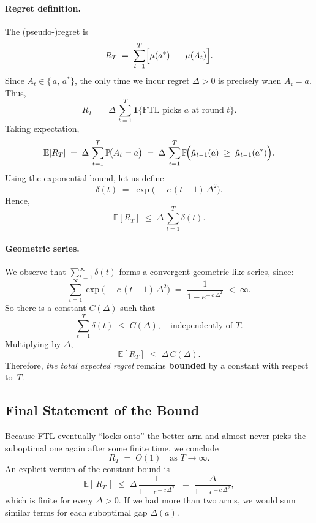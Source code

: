 \paragraph{Regret definition.}
The (pseudo-)regret is
\[
  R_T
  \;=\;
  \sum_{t=1}^T
  \Bigl[\mu(a^*) \;-\;\mu(A_t)\Bigr].
\]
Since $A_t \in \{\,a,\,a^*\!\}$, the only time we incur regret $\Delta>0$ is precisely when $A_t=a$.  Thus,
\[
  R_T
  \;=\;
  \Delta \,\sum_{t=1}^T \mathbf{1}\{\text{FTL picks $a$ at round $t$}\}.
\]
Taking expectation,
\[
  \mathbb{E}[R_T]
  \;=\;
  \Delta \,\sum_{t=1}^T
  \mathbb{P}\!\bigl(A_t = a\bigr)
  \;=\;
  \Delta \,\sum_{t=1}^T
  \mathbb{P}\!\Bigl(\hat{\mu}_{t-1}(a)\;\ge\;\hat{\mu}_{t-1}(a^*)\Bigr).
\]
Using the exponential bound, let us define
\[
  \delta(t)
  \;=\;
  \exp\bigl(-\,c\,(t-1)\,\Delta^2\bigr).
\]
Hence,
\[
  \mathbb{E}[R_T]
  \;\le\;
  \Delta \,\sum_{t=1}^T \delta(t).
\]

\paragraph{Geometric series.}
We observe that $\sum_{t=1}^\infty \delta(t)$ forms a convergent geometric-like series, since:
\[
  \sum_{t=1}^\infty
  \exp\bigl(-\,c\,(t-1)\,\Delta^2\bigr)
  \;=\;
  \frac{1}{1 - e^{-\,c\,\Delta^2}}
  \;<\;\infty.
\]
So there is a constant $C(\Delta)$ such that
\[
  \sum_{t=1}^T
  \delta(t)
  \;\le\;
  C(\Delta),
  \quad
  \text{independently of $T$.}
\]
Multiplying by $\Delta$,
\[
  \mathbb{E}[R_T]
  \;\le\;
  \Delta \,C(\Delta).
\]
Therefore, \emph{the total expected regret} remains \textbf{bounded} by a constant with respect to~$T$.

\subsection*{Final Statement of the Bound}

Because FTL eventually ``locks onto'' the better arm and almost never picks the suboptimal one again after some finite time, we conclude
\[
  R_T
  \;=\;
  O(1)
  \quad\text{as }T\to\infty.
\]
An explicit version of the constant bound is
\[
  \mathbb{E}[\,R_T\,]
  \;\le\;
  \Delta
  \,\frac{1}{1 - e^{-\,c\,\Delta^2}}
  \;\;=\;
  \frac{\Delta}{1 - e^{-\,c\,\Delta^2}},
\]
which is finite for every $\Delta>0$.  If we had more than two arms, we would sum similar terms for each suboptimal gap $\Delta(a)$.